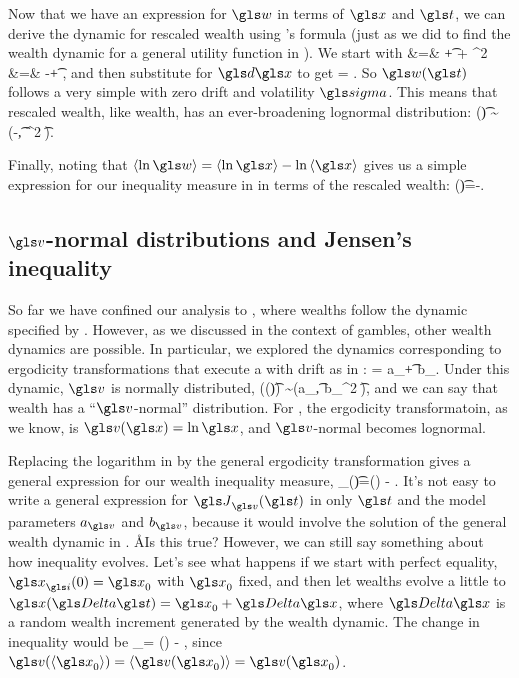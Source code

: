 Now that we have an expression for $\gw$ in terms of $\x$ and $\t$, we can derive the dynamic for rescaled wealth using \Ito's formula (just as we did to find the wealth dynamic for a general utility function in ). We start with
\bea
\gd \gw &=& \frac{\partial \gw}{\partial \t}\gd\t + \frac{\partial \gw}{\partial \x}\gd\x +   \gd\x^2 \\
&=& -\gmu \gw\gd\t + \frac{\gw}{\x}\gd\x {},
\eea
and then substitute  for $\gd\x$ to get
\be
\gd \gw = \gw \gsigma \gd\gW.
\ee
So $\gw(\t)$ follows a very simple \GBM with zero drift and volatility $\gsigma$. This means that rescaled wealth, like wealth, has an ever-broadening lognormal distribution:
\be
\ln \gw(\t) \sim \mathcal{\N}\left(-\t, \gsigma^2 \t\right).
\ee

Finally, noting that $\ave{\ln \gw}=\ave{\ln \x}-\ln\ave{\x}$ gives us a simple expression for our inequality measure in  in terms of the rescaled wealth:
\be
\J(\t)=-\ave{\ln \gw}.
\ee


\subsection{$\gv$-normal distributions and Jensen's inequality}
So far we have confined our analysis to \GBM, where wealths follow the dynamic specified by . However, as we discussed in the context of gambles, other wealth dynamics are possible. In particular, we explored the dynamics corresponding to ergodicity transformations that execute a \BM with drift as in :
\be
\gd\gv = a_\gv \gd\t + b_\gv \gd\gW.
\ee
Under this dynamic, $\gv$ is normally distributed,
\be
\gv(\x(\t)) \sim \mathcal{\N}\left(a_\gv\t, {b_\gv}^2 \t\right),
\ee
and we can say that wealth has a ``$\gv$-normal'' distribution. For \GBM, the ergodicity transformatoin, as we know, is $\gv(\x)=\ln \x$, and $\gv$-normal becomes lognormal.

Replacing the logarithm in  by the general ergodicity transformation gives a general expression for our wealth inequality measure,
\be
\J_\gv(\t)=\gv(\ave{\x(\t)}) - \ave{\gv(\x(\t))}.
\ee
It's not easy to write a general expression for $\J_\gv(\t)$ in only $\t$ and the model parameters $a_\gv$ and $b_\gv$, because it would involve the solution of the general wealth dynamic in . \AA{Is this true?} However, we can still say something about how inequality evolves. Let's see what happens if we start with perfect equality, $\x_\gi(0)=\x_0$ with $\x_0$ fixed, and then let wealths evolve a little to $\x(\D \t)=\x_0+\D \x$, where $\D \x$ is a random wealth increment generated by the wealth dynamic. The change in inequality would be
\be
\D \J_\gv = \gv() - ,
\ee
since $\gv(\ave{\x_0})=\ave{\gv(\x_0)}=\gv(\x_0)$.

